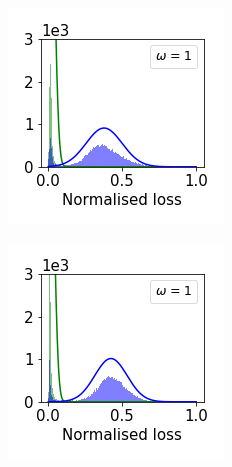\documentclass[11pt]{article}
\begin{document}
\begin{figure}[t]
\begin{subfigure}{.18\textwidth}
  \end{subfigure}
  \begin{subfigure}{.18\textwidth}
    \centering
    \includegraphics[width=\linewidth]{images/loss_dist/DM_0.6_0.00_cifar100.png} 
  \end{subfigure}
  \begin{subfigure}{.18\textwidth}
    \centering
    \includegraphics[width=\linewidth]{images/loss_dist/DM_0.6_0.00_imagenet32.png} 

\end{subfigure}
\end{figure}
\end{document}
